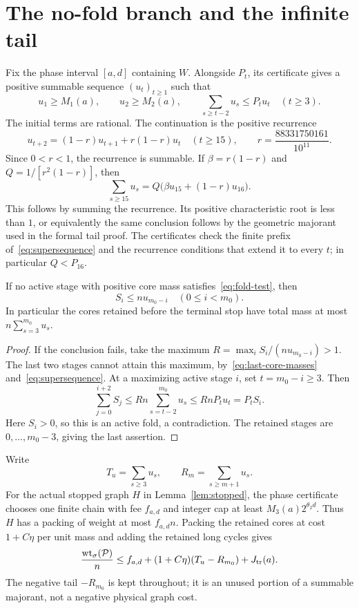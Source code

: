 \section{The no-fold branch and the infinite tail}\label{sec:terminal}
Fix the phase interval $[a,d]$ containing $W$. Alongside $P_t$, its
certificate gives a positive summable sequence $(u_t)_{t\ge1}$ such that
\begin{equation}\label{eq:supersequence}
 u_1\ge M_1(a),\qquad u_2\ge M_2(a),\qquad
                  \sum_{s\ge t-2}u_s\le P_tu_t\quad(t\ge3).
\end{equation}
The initial terms are rational. The continuation is the positive recurrence
\begin{equation}\label{eq:tail-recurrence}
 u_{t+2}=(1-r)u_{t+1}+r(1-r)u_t\quad(t\ge15),
 \qquad r=\frac{88331750161}{10^{11}}.
\end{equation}
Since $0<r<1$, the recurrence is summable. If $\beta=r(1-r)$ and
$Q=1/[r^2(1-r)]$, then
\begin{equation}\label{eq:tail-sum}
       \sum_{s\ge15}u_s=Q\bigl(\beta u_{15}+(1-r)u_{16}\bigr).
\end{equation}
This follows by summing the recurrence. Its positive characteristic root
is less than $1$, or equivalently the same conclusion follows by the
geometric majorant used in the formal tail proof. The certificates check
the finite prefix of~\eqref{eq:supersequence} and the recurrence conditions
that extend it to every $t$; in particular $Q<P_{16}$.

\begin{lemma}\label{lem:no-fold-mass}
If no active stage with positive core mass satisfies~\eqref{eq:fold-test},
then
\[
                    S_i\le n u_{m_0-i}\quad(0\le i<m_0).
\]
In particular the cores retained before the terminal stop have total mass
at most $n\sum_{s=3}^{m_0}u_s$.
\end{lemma}
\begin{proof}
If the conclusion fails, take the maximum
$R=\max_i S_i/(nu_{m_0-i})>1$. The last two stages cannot attain this
maximum, by~\eqref{eq:last-core-masses} and~\eqref{eq:supersequence}.
At a maximizing active stage $i$, set $t=m_0-i\ge3$. Then
\[
 \sum_{j=0}^{i+2}S_j
   \le Rn\sum_{s=t-2}^{m_0}u_s
   \le RnP_tu_t=P_tS_i.
\]
Here $S_i>0$, so this is an active fold, a contradiction.
The retained stages are $0,\ldots,m_0-3$, giving the last assertion.
\end{proof}

Write
\[
 T_u=\sum_{s\ge3}u_s,\qquad R_m=\sum_{s\ge m+1}u_s.
\]
For the actual stopped graph $H$ in Lemma~\ref{lem:stopped}, the phase
certificate chooses one finite chain with fee $f_{a,d}$ and integer cap
at least $M_3(a)2^{\theta_2d}$. Thus $H$ has a packing of weight at most
$f_{a,d}n$. Packing the retained cores at cost $1+C\eta$ per unit mass
and adding the retained long cycles gives
\begin{equation}\label{eq:terminal-physical}
 \frac{\operatorname{wt}_\sigma(\mathcal P)}n
       \le f_{a,d}+(1+C\eta)(T_u-R_{m_0})+J_{\rm tr}(a).
\end{equation}
The negative tail $-R_{m_0}$ is kept throughout; it is an unused portion
of a summable majorant, not a negative physical graph cost.

